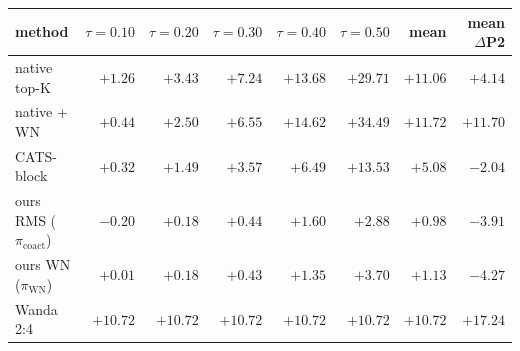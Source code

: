 \setlength{\tabcolsep}{4pt}
\begin{tabular}{lrrrrrrr}
\toprule
method & $\tau{=}0.10$ & $\tau{=}0.20$ & $\tau{=}0.30$ & $\tau{=}0.40$ & $\tau{=}0.50$ & mean & mean $\Delta$P2 \\
\midrule
native top-K & $+1.26$ & $+3.43$ & $+7.24$ & $+13.68$ & $+29.71$ & $+11.06$ & $+4.14$ \\
native + WN & $+0.44$ & $+2.50$ & $+6.55$ & $+14.62$ & $+34.49$ & $+11.72$ & $+11.70$ \\
CATS-block & $+0.32$ & $+1.49$ & $+3.57$ & $+6.49$ & $+13.53$ & $+5.08$ & $-2.04$ \\
ours RMS ($\pi_{\mathrm{coact}}$) & $\mathbf{-0.20}$ & $\mathbf{+0.18}$ & $+0.44$ & $+1.60$ & $\mathbf{+2.88}$ & $+0.98$ & $-3.91$ \\
ours WN ($\pi_{\mathrm{WN}}$) & $+0.01$ & $+0.18$ & $\mathbf{+0.43}$ & $\mathbf{+1.35}$ & $+3.70$ & $+1.13$ & $-4.27$ \\
Wanda 2:4 & $+10.72$ & $+10.72$ & $+10.72$ & $+10.72$ & $+10.72$ & $+10.72$ & $+17.24$ \\
\bottomrule
\end{tabular}
